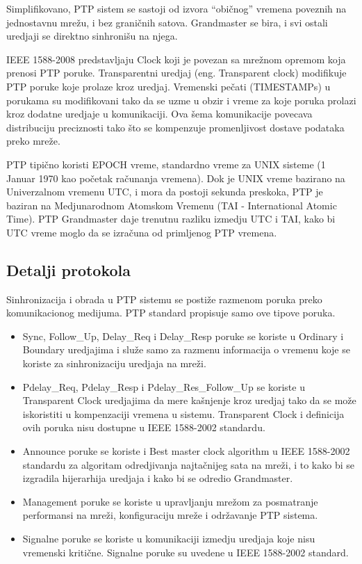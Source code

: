\documentclass[a4paper,12pt, master]{etf}
\begin{document}
    Simplifikovano, PTP sistem se sastoji od izvora ``obi\v{c}nog'' vremena
    poveznih na jednostavnu mre\v{z}u, i bez grani\v{c}nih satova. Grandmaster
    se bira, i svi ostali uredjaji se direktno sinhroni\v{s}u na njega.

	IEEE 1588-2008 predstavljaju Clock koji je povezan sa mre\v{z}nom opremom
    koja prenosi PTP poruke.  Transparentni uredjaj (eng\@. Transparent clock)
	modifikuje PTP poruke koje prolaze kroz uredjaj. Vremenski pe\v{c}ati
	(TIMESTAMPs) u porukama su modifikovani tako da se uzme u obzir i vreme za
	koje poruka prolazi kroz dodatne uredjaje u komunikaciji. Ova \v{s}ema
	komunikacije povecava distribuciju preciznosti tako \v{s}to se kompenzuje
	promenljivost dostave podataka preko mre\v{z}e.

	PTP tipi\v{c}no koristi EPOCH vreme, standardno vreme za UNIX sisteme (1
	Januar 1970 kao po\v{c}etak ra\v{c}unanja vremena). Dok je UNIX vreme
	bazirano na Univerzalnom vremenu UTC, i mora da postoji sekunda preskoka,
    PTP je baziran na Medjunarodnom Atomskom Vremenu (TAI - International Atomic
    Time). PTP Grandmaster daje trenutnu razliku izmedju UTC i TAI, kako bi UTC
    vreme moglo da se izra\v{c}una od primljenog PTP vremena.

	\subsection{Detalji protokola}

	Sinhronizacija i obrada u PTP sistemu se posti\v{z}e razmenom poruka preko
	komunikacionog medijuma. PTP standard propisuje samo ove tipove poruka.

	\begin{itemize}
		\item Sync, Follow\_Up, Delay\_Req i Delay\_Resp poruke se koriste u
		Ordinary i Boundary uredjajima i slu\v{z}e samo za razmenu informacija
		o vremenu koje se koriste za sinhronizaciju uredjaja na mre\v{z}i.
		\item Pdelay\_Req, Pdelay\_Resp i Pdelay\_Res\_Follow\_Up se koriste u
		Transparent Clock uredjajima da mere ka\v{s}njenje kroz uredjaj tako da
		se mo\v{z}e iskoristiti u kompenzaciji vremena u sistemu. Transparent
		Clock i definicija ovih poruka nisu dostupne u IEEE 1588-2002 standardu.
		\item Announce poruke se koriste i Best master clock algorithm u IEEE
		1588-2002 standardu za algoritam odredjivanja najta\v{c}nijeg sata na
		mre\v{z}i, i to kako bi se izgradila hijerarhija uredjaja i kako bi se
		odredio Grandmaster.
		\item Management poruke se koriste u upravljanju mre\v{z}om za
		posmatranje performansi na mre\v{z}i, konfiguraciju mre\v{z}e i
		odr\v{z}avanje PTP sistema.
		\item Signalne poruke se koriste u komunikaciji izmedju uredjaja koje
		nisu vremenski kriti\v{c}ne. Signalne poruke su uvedene u IEEE
		1588-2002 standard.
	\end{itemize}
\end{document}
